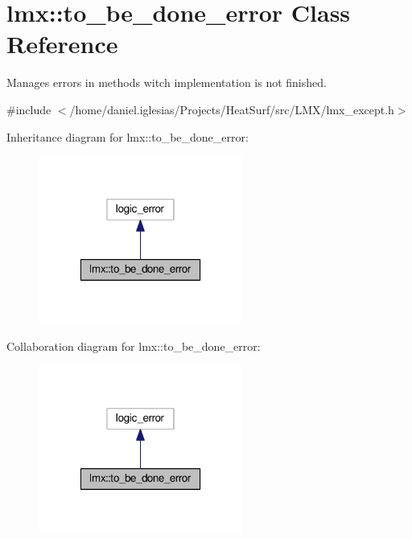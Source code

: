 \hypertarget{classlmx_1_1to__be__done__error}{\section{lmx\-:\-:to\-\_\-be\-\_\-done\-\_\-error Class Reference}
\label{classlmx_1_1to__be__done__error}
}


Manages errors in methods witch implementation is not finished.  




{\ttfamily \#include $<$/home/daniel.\-iglesias/\-Projects/\-Heat\-Surf/src/\-L\-M\-X/lmx\-\_\-except.\-h$>$}



Inheritance diagram for lmx\-:\-:to\-\_\-be\-\_\-done\-\_\-error\-:
\nopagebreak
\begin{figure}[H]
\begin{center}
\leavevmode
\includegraphics[width=190pt]{classlmx_1_1to__be__done__error__inherit__graph}
\end{center}
\end{figure}


Collaboration diagram for lmx\-:\-:to\-\_\-be\-\_\-done\-\_\-error\-:
\nopagebreak
\begin{figure}[H]
\begin{center}
\leavevmode
\includegraphics[width=190pt]{classlmx_1_1to__be__done__error__coll__graph}
\end{center}
\end{figure}
